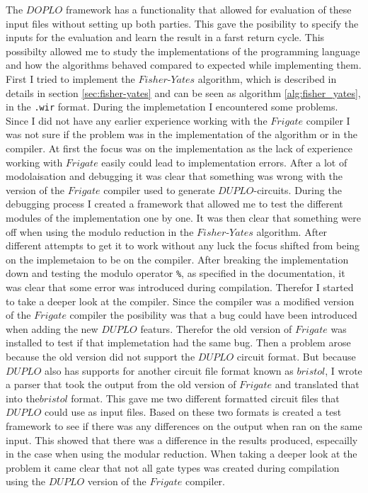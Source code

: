\documentclass[twoside,11pt,openright]{report}
\begin{document}
The $DOPLO$ framework has a functionality that allowed for evaluation of these input files without setting up both parties. This gave the posibility to specify the inputs for the evaluation and learn the result in a farst return cycle. This possibilty allowed me to study the implementations of the programming language and how the algorithms behaved compared to expected while implementing them. First I tried to implement the $Fisher\text{-}Yates$ algorithm, which is described in details in section \ref{sec:fisher-yates} and can be seen as algorithm \ref{alg:fisher_yates}, in the \verb|.wir| format. During the implemetation I encountered some problems. Since I did not have any earlier experience working with the $Frigate$ compiler I was not sure if the problem was in the implementation of the algorithm or in the compiler. At first the focus was on the implementation as the lack of experience working with $Frigate$ easily could lead to implementation errors. After a lot of modolaisation and debugging it was clear that something was wrong with the version of the $Frigate$ compiler used to generate $DUPLO$-circuits. During the debugging process I created a framework that allowed me to test the different modules of the implementation one by one. It was then clear that something were off when using the modulo reduction in the $Fisher\text{-}Yates$ algorithm. After different attempts to get it to work without any luck the focus shifted from being on the implemetaion to be on the compiler. After breaking the implementation down and testing the modulo operator \verb|%|, as specified in the documentation, it was clear that some error was introduced during compilation. Therefor I started to take a deeper look at the compiler. Since the compiler was a modified version of the $Frigate$ compiler the posibility was that a bug could have been introduced when adding the new $DUPLO$ featurs. Therefor the old version of $Frigate$ was installed to test if that implemetation had the same bug. Then a problem arose because the old version did not support the $DUPLO$ circuit format. But because $DUPLO$ also has  supports for another circuit file format known as $bristol$, I wrote a parser that took the output from the old version of $Frigate$ and translated that into the$bristol$ format. This gave me two different formatted circuit files that $DUPLO$ could use as input files. Based on these two formats is created a test framework to see if there was any differences on the output when ran on the same input. This showed that there was a difference in the results produced, especailly in the case when using the modular reduction. When taking a deeper look at the problem it came clear that not all gate types was created during compilation using the $DUPLO$ version of the $Frigate$ compiler.
\end{document}
